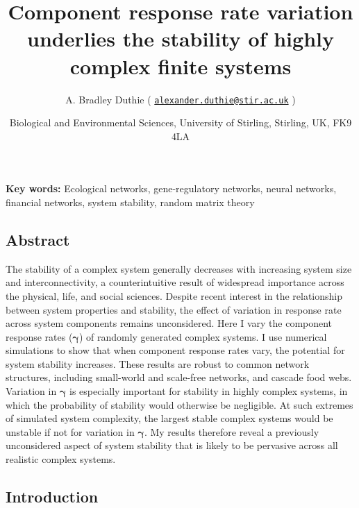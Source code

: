 \documentclass[]{article}
\title{Component response rate variation underlies the stability of highly
complex finite systems}
\author{A. Bradley Duthie (
\href{mailto:alexander.duthie@stir.ac.uk}{\nolinkurl{alexander.duthie@stir.ac.uk}}
)}
\date{Biological and Environmental Sciences, University of Stirling, Stirling,
UK, FK9 4LA}
\begin{document}
\maketitle

\textbf{Key words:} Ecological networks, gene-regulatory networks,
neural networks, financial networks, system stability, random matrix
theory

\subsection{Abstract}\label{abstract}

The stability of a complex system generally decreases with increasing
system size and interconnectivity, a counterintuitive result of
widespread importance across the physical, life, and social sciences.
Despite recent interest in the relationship between system properties
and stability, the effect of variation in response rate across system
components remains unconsidered. Here I vary the component response
rates (\(\boldsymbol{\gamma}\)) of randomly generated complex systems. I
use numerical simulations to show that when component response rates
vary, the potential for system stability increases. These results are
robust to common network structures, including small-world and
scale-free networks, and cascade food webs. Variation in
\(\boldsymbol{\gamma}\) is especially important for stability in highly
complex systems, in which the probability of stability would otherwise
be negligible. At such extremes of simulated system complexity, the
largest stable complex systems would be unstable if not for variation in
\(\boldsymbol{\gamma}\). My results therefore reveal a previously
unconsidered aspect of system stability that is likely to be pervasive
across all realistic complex systems.

\subsection{Introduction}\label{introduction}
\end{document}
